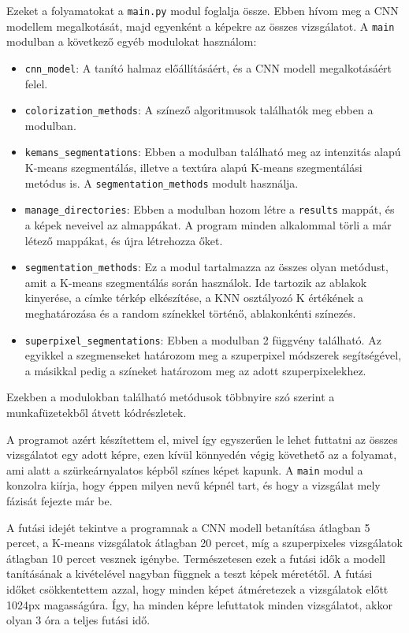 Ezeket a folyamatokat a \texttt{main.py} modul foglalja össze. Ebben hívom meg a CNN modellem megalkotását, majd egyenként a képekre az összes vizsgálatot. A \texttt{main} modulban a következő egyéb modulokat használom:
\begin{itemize}
\item \texttt{cnn\_model}: A tanító halmaz előállításáért, és a CNN modell megalkotásáért felel.
\item \texttt{colorization\_methods}: A színező algoritmusok találhatók meg ebben a modulban.
\item \texttt{kemans\_segmentations}: Ebben a modulban található meg az intenzitás alapú K-means szegmentálás, illetve a textúra alapú K-means szegmentálási metódus is. A \texttt{segmentation\_methods} modult használja.
\item \texttt{manage\_directories}: Ebben a modulban hozom létre a \texttt{results} mappát, és a képek neveivel az almappákat. A program minden alkalommal törli a már létező mappákat, és újra létrehozza őket.
\item \texttt{segmentation\_methods}: Ez a modul tartalmazza az összes olyan metódust, amit a K-means szegmentálás során használok. Ide tartozik az ablakok kinyerése, a címke térkép elkészítése, a KNN osztályozó K értékének a meghatározása és a random színekkel történő, ablakonkénti színezés.
\item \texttt{superpixel\_segmentations}: Ebben a modulban 2 függvény található. Az egyikkel a szegmenseket határozom meg a szuperpixel módszerek segítségével, a másikkal pedig a színeket határozom meg az adott szuperpixelekhez. 
\end{itemize}

Ezekben a modulokban található metódusok többnyire szó szerint a munkafüzetekből átvett kódrészletek.

A programot azért készítettem el, mivel így egyszerűen le lehet futtatni az összes vizsgálatot egy adott képre, ezen kívül könnyedén végig követhető az a folyamat, ami alatt a szürkeárnyalatos képből színes képet kapunk. A \texttt{main} modul a konzolra kiírja, hogy éppen milyen nevű képnél tart, és hogy a vizsgálat mely fázisát fejezte már be.

A futási idejét tekintve a programnak a CNN modell betanítása átlagban 5 percet, a K-means vizsgálatok átlagban 20 percet, míg a szuperpixeles vizsgálatok átlagban 10 percet vesznek igénybe. Természetesen ezek a futási idők a modell tanításának a kivételével nagyban függnek a teszt képek méretétől. A futási időket csökkentettem azzal, hogy minden képet átméretezek a vizsgálatok előtt 1024px magasságúra. Így, ha minden képre lefuttatok minden vizsgálatot, akkor olyan 3 óra a teljes futási idő.

